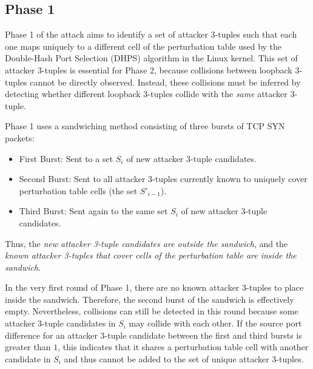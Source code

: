 \documentclass{report}
\begin{document}
\subsection{Phase 1}
\label{sec:phase 1}


Phase 1 of the attack aims to identify a set of attacker 3-tuples such that each one maps uniquely to a different cell of the perturbation table used by the Double-Hash Port Selection (DHPS) algorithm in the Linux kernel. This set of attacker 3-tuples is essential for Phase 2, because collisions between loopback 3-tuples cannot be directly observed. Instead, these collisions must be inferred by detecting whether different loopback 3-tuples collide with the \emph{same} attacker 3-tuple.


Phase 1 uses a \alert{sandwiching method} consisting of three bursts of TCP SYN packets:

\begin{itemize}
    \item \alert{First Burst:} Sent to a set $S_i$ of new attacker 3-tuple candidates.
    \item \alert{Second Burst:} Sent to all attacker 3-tuples currently known to uniquely cover perturbation table cells (the set $S'_{i-1}$).
    \item \alert{Third Burst:} Sent again to the same set $S_i$ of new attacker 3-tuple candidates.
\end{itemize}

Thus, the \emph{new attacker 3-tuple candidates are outside the sandwich}, and the \emph{known attacker 3-tuples that cover cells of the perturbation table are inside the sandwich}.


In the very first round of Phase 1, there are no known attacker 3-tuples to place inside the sandwich. Therefore, the second burst of the sandwich is effectively empty. Nevertheless, collisions can still be detected in this round because some attacker 3-tuple candidates in $S_i$ may collide with each other. If the source port difference for an attacker 3-tuple candidate between the first and third bursts is greater than $1$, this indicates that it shares a perturbation table cell with another candidate in $S_i$ and thus cannot be added to the set of unique attacker 3-tuples.
\end{document}
